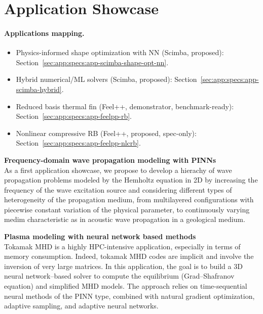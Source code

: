 \section{Application Showcase}
% 
%  

\paragraph{Applications mapping.}
\begin{itemize}
  \item Physics-informed shape optimization with NN (Scimba, proposed): Section~\ref{sec:app:specs:app-scimba-shape-opt-nn}.
  \item Hybrid numerical/ML solvers (Scimba, proposed): Section~\ref{sec:app:specs:app-scimba-hybrid}.
  \item Reduced basis thermal fin (Feel++, demonstrator, benchmark-ready): Section~\ref{sec:app:specs:app-feelpp-rb}.
  \item Nonlinear compressive RB (Feel++, proposed, spec-only): Section~\ref{sec:app:specs:app-feelpp-nlcrb}.
\end{itemize}

\textbf{Frequency-domain wave propagation modeling with PINNs} \\

As a first  application showcase, we propose to develop  a hierachy of
wave propagation  problems modeled by  the Hemholtz equation in  2D by
increasing   the  frequency   of  the   wave  excitation   source  and
considering  different  types  of heterogeneity  of  the  propagation
medium,  from  multilayered  configurations  with  piecewise  constant
variation  of the  physical parameter,  to continuously  varying medim
characteristic  as  in  acoustic  wave propagation  in  a  geological
medium.

\textbf{Plasma modeling with neural network based methods }\\

Tokamak MHD is a highly HPC-intensive application, especially in terms
of  memory consumption.  Indeed, tokamak  MHD codes  are implicit  and
involve the inversion of very large matrices. In this application, the
goal  is to  build a  3D neural  network–based solver  to compute  the
equilibrium (Grad–Shafranov  equation) and simplified MHD  models. The
approach relies  on time-sequential neural  methods of the  PINN type,
combined with  natural gradient  optimization, adaptive  sampling, and
adaptive neural networks.

